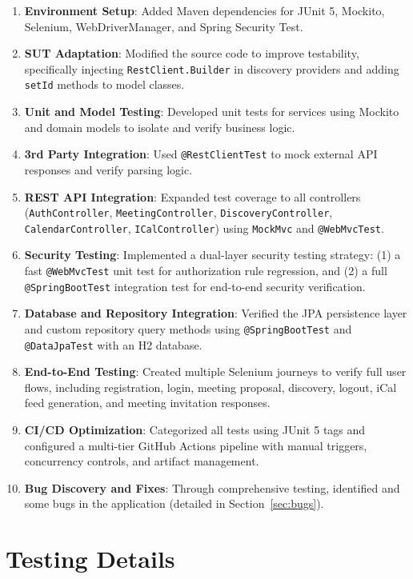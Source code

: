 \documentclass[11pt]{article}
\begin{document}
  \begin{enumerate}
    \item \textbf{Environment Setup}: Added Maven dependencies for JUnit 5, Mockito, Selenium, WebDriverManager, and Spring Security Test.
    \item \textbf{SUT Adaptation}: Modified the source code to improve testability, specifically injecting \texttt{RestClient.Builder} in discovery providers and adding \texttt{setId} methods to model classes.
    \item \textbf{Unit and Model Testing}: Developed unit tests for services using Mockito and domain models to isolate and verify business logic.
    \item \textbf{3rd Party Integration}: Used \texttt{@RestClientTest} to mock external API responses and verify parsing logic.
    \item \textbf{REST API Integration}: Expanded test coverage to all controllers (\texttt{AuthController}, \texttt{MeetingController}, \texttt{DiscoveryController}, \texttt{CalendarController}, \texttt{ICalController}) using \texttt{MockMvc} and \texttt{@WebMvcTest}.
    \item \textbf{Security Testing}: Implemented a dual-layer security testing strategy: (1) a fast \texttt{@WebMvcTest} unit test for authorization rule regression, and (2) a full \texttt{@SpringBootTest} integration test for end-to-end security verification.
    \item \textbf{Database and Repository Integration}: Verified the JPA persistence layer and custom repository query methods using \texttt{@SpringBootTest} and \texttt{@DataJpaTest} with an H2 database.
    \item \textbf{End-to-End Testing}: Created multiple Selenium journeys to verify full user flows, including registration, login, meeting proposal, discovery, logout, iCal feed generation, and meeting invitation responses.
    \item \textbf{CI/CD Optimization}: Categorized all tests using JUnit 5 tags and configured a multi-tier GitHub Actions pipeline with manual triggers, concurrency controls, and artifact management.
    \item \textbf{Bug Discovery and Fixes}: Through comprehensive testing, identified and some bugs in the application (detailed in Section~\ref{sec:bugs}).
  \end{enumerate}

  \section{Testing Details}
\end{document}
